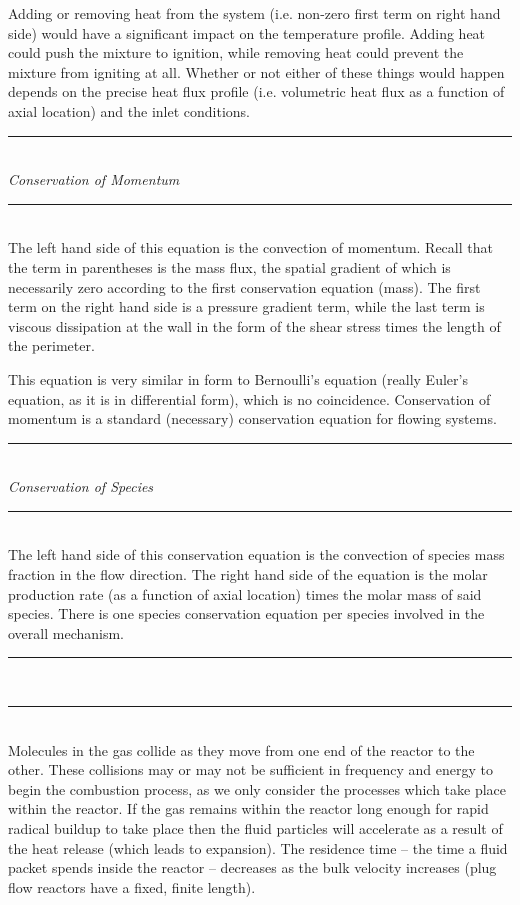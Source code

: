 \documentclass[11pt]{article}
\newcommand{\Header}[1]{\noindent\rule{\textwidth}{0.4pt}\\[0.3cm]\indent \large{\textit{#1}}\normalsize{}\\[-0.1cm]\noindent\rule{\textwidth}{0.4pt}}
\begin{document}
Adding or removing heat from the system (i.e. non-zero first term on right hand side) would have a significant impact on the temperature profile. Adding heat could push the mixture to ignition, while removing heat could prevent the mixture from igniting at all. Whether or not either of these things would happen depends on the precise heat flux profile (i.e. volumetric heat flux as a function of axial location) and the inlet conditions.

\Header{Conservation of Momentum}\\

The left hand side of this equation is the convection of momentum. Recall that the term in parentheses is the mass flux, the spatial gradient of which is necessarily zero according to the first conservation equation (mass). The first term on the right hand side is a pressure gradient term, while the last term is viscous dissipation at the wall in the form of the shear stress times the length of the perimeter.

This equation is very similar in form to Bernoulli's equation (really Euler's equation, as it is in differential form), which is no coincidence. Conservation of momentum is a standard (necessary) conservation equation for flowing systems.

\Header{Conservation of Species}\\

The left hand side of this conservation equation is the convection of species mass fraction in the flow direction. The right hand side of the equation is the molar production rate (as a function of axial location) times the molar mass of said species. There is one species conservation equation per species involved in the overall mechanism.\\

\noindent\rule{\textwidth}{0.4pt}\\
\noindent\rule{\textwidth}{0.4pt}\\[0.3cm]

Molecules in the gas collide as they move from one end of the reactor to the other. These collisions may or may not be sufficient in frequency and energy to begin the combustion process, as we only consider the processes which take place within the reactor. If the gas remains within the reactor long enough for rapid radical buildup to take place then the fluid particles will accelerate as a result of the heat release (which leads to expansion). The residence time -- the time a fluid packet spends inside the reactor -- decreases as the bulk velocity increases (plug flow reactors have a fixed, finite length).\\
\end{document}
